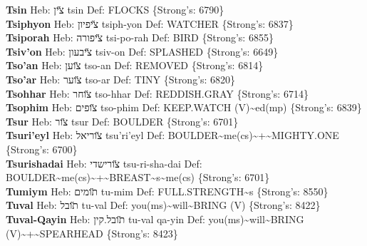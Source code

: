 {\textbf{Tsin} Heb: {\large\H צין} tsin Def: FLOCKS \{Strong's: 6790\}\hfill{}\\

\textbf{Tsiphyon} Heb: {\large\H ציפיון} tsiph-yon Def: WATCHER \{Strong's: 6837\}\hfill{}\\

\textbf{Tsiporah} Heb: {\large\H ציפורה} tsi-po-rah Def: BIRD \{Strong's: 6855\}\hfill{}\\

\textbf{Tsiv'on} Heb: {\large\H ציבעון} tsiv-on Def: SPLASHED \{Strong's: 6649\}\hfill{}\\

\textbf{Tso'an} Heb: {\large\H צוען} tso-an Def: REMOVED \{Strong's: 6814\}\hfill{}\\

\textbf{Tso'ar} Heb: {\large\H צוער} tso-ar Def: TINY \{Strong's: 6820\}\hfill{}\\

\textbf{Tsohhar} Heb: {\large\H צוחר} tso-hhar Def: REDDISH.GRAY \{Strong's: 6714\}\hfill{}\\

\textbf{Tsophim} Heb: {\large\H צופים} tso-phim Def: KEEP.WATCH (V)\textasciitilde{}ed(mp) \{Strong's: 6839\}\hfill{}\\

\textbf{Tsur} Heb: {\large\H צור} tsur Def: BOULDER \{Strong's: 6701\}\hfill{}\\

\textbf{Tsuri'eyl} Heb: {\large\H צוריאל} tsu'ri'eyl Def: BOULDER\textasciitilde{}me(cs)\textasciitilde{}+\textasciitilde{}MIGHTY.ONE \{Strong's: 6700\}\hfill{}\\

\textbf{Tsurishadai} Heb: {\large\H צורישדי} tsu-ri-sha-dai Def: BOULDER\textasciitilde{}me(cs)\textasciitilde{}+\textasciitilde{}BREAST\textasciitilde{}s\textasciitilde{}me(cs) \{Strong's: 6701\}\hfill{}\\

\textbf{Tumiym} Heb: {\large\H תומים} tu-mim Def: FULL.STRENGTH\textasciitilde{}s \{Strong's: 8550\}\hfill{}\\

\textbf{Tuval} Heb: {\large\H תובל} tu-val Def: you(ms)\textasciitilde{}will\textasciitilde{}BRING (V) \{Strong's: 8422\}\hfill{}\\

\textbf{Tuval-Qayin} Heb: {\large\H תובל.קין} tu-val qa-yin Def: you(ms)\textasciitilde{}will\textasciitilde{}BRING (V)\textasciitilde{}+\textasciitilde{}SPEARHEAD \{Strong's: 8423\}\hfill{}\\

}
